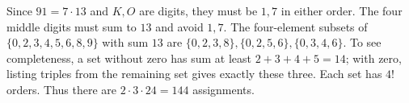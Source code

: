 Since $91=7\cdot13$ and $K,O$ are digits, they must be $1,7$ in either order. The four middle digits must sum to $13$ and avoid $1,7$. The four-element subsets of $\{0,2,3,4,5,6,8,9\}$ with sum $13$ are $\{0,2,3,8\},\{0,2,5,6\},\{0,3,4,6\}$. To see completeness, a set without zero has sum at least $2+3+4+5=14$; with zero, listing triples from the remaining set gives exactly these three. Each set has $4!$ orders. Thus there are $2\cdot3\cdot24=\boxed{144}$ assignments.
